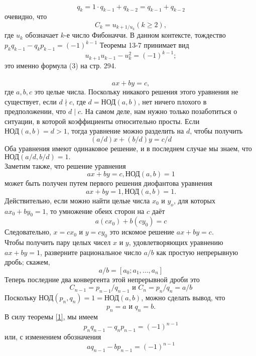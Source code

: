 \documentclass[a4paper,12pt]{article}
\renewcommand{\headrulewidth}{0pt}
\begin{document}
    \newpage
    \renewcommand{\headrulewidth}{0pt}
    \lhead{\textbf{\thepage}}
    \setcounter{page}{308}
     \\
    \[q_k = 1\cdot q_{k-1} + q_{k-2} = q_{k-1}+ q_{k-2} \]
    очевидно, что
    \[C_k = u_{k+1/ u_k} (k\geq 2),\]
  где $u_k$ обозначает $k$-е число Фибоначчи. В данном контексте,  тождество $p_k q_{k-1} - q_k p_{k-1} = (-1)^{k-1}$ Теоремы 13-7 принимает вид \[u_{k+1} u_{k-1} - u^2_k = (-1)^{k-1};\]
  это именно формула (3) на стр. 294.\\\\
  \[a x + b y = c,\]
  где $a, b, c$ это целые числа. Поскольку никакого решения этого уравнения не существует, если $d \nmid c$, где $d=\text{НОД}(a, b)$, нет ничего плохого в предположении, что $d \mid c$. На самом деле, нам нужно только позаботиться о ситуации, в которой коэффициенты относительно просты. Если $\text{НОД}(a, b)=d>1$, тогда уравнение можно разделить на $d$, чтобы получить 
  \[(a/d)x + (b/d)y = c/d\]
  Оба уравнения имеют одинаковое решение, и в последнем случае мы знаем, что $\text{НОД}(a/d, b/d) = 1.$\\
  \indent Заметим также, что решение уравнения 
  \[a x + b y = c, \text{НОД}(a, b) = 1\]
  может быть получен путем первого решения диофантова уравнения
  \[a x + b y = 1, \text{НОД}(a, b) = 1.\]
  Действительно, если можно найти целые числа $x_0$ и $y_o$, для которых\\ 
  $a x_0 + b y_0 = 1$, то умножение обеих сторон на $c$ даёт
  \[a(c x_0)  + b(c y_0) = c\]
  Следовательно, $x=c x_0$ и $y=c y_0$ это искомое решение $a x + b y = c.$\\
  \indent Чтобы получить пару целых чисел $x$ и $y$, удовлетворяющих уравнению $a x + b y = 1$, разверните рациональное число $a/b$  как простую непрерывную дробь; скажем,
  \[a/b = [a_0; a_1, \ldots , a_n]\]
 \newpage
 \renewcommand{\headrulewidth}{0pt}
 \rhead{\textbf{\thepage}}
 \setcounter{page}{309}
 \noindent Теперь последние два конвергента этой непрерывной дроби это
 \[C_{n-1}=p_{n-1}/q_{n-1} \text{ и } C_n=p_n/q_n=a/b\]
 Поскольку $\text{НОД}(p_n, q_n)=1=\text{НОД}(a, b)$, можно сделать вывод, что
 	\[p_n=a \text{ и } q_n=b.\]
 В силу теоремы \ref{1}, мы имеем
 \[p_nq_{n-1} - q_np_{n-1} = (-1)^{n-1}\]
 или, с изменением обозначения 
 \[a q_{n-1} - b p_{n-1} = (-1)^{n-1}\]
\end{document}
